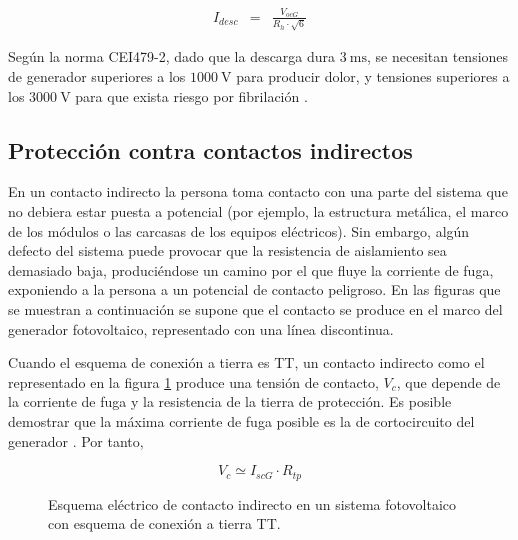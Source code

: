 \begin{eqnarray}
I_{desc} & = & \frac{V_{ocG}}{R_{h}\cdot\sqrt{6}}\label{eq:IdescIT}\end{eqnarray}

Según la norma CEI479-2, dado que la descarga dura $\SI{3}{\milli\second}$,
se necesitan tensiones de generador superiores a los $\SI{1000}{\volt}$
para producir dolor, y tensiones superiores a los $\SI{3000}{\volt}$
para que exista riesgo por fibrilación \cite{PerezGabarda2000a}.


\subsection{Protección contra contactos indirectos}

En un contacto indirecto la persona toma contacto con una parte del
sistema que no debiera estar puesta a potencial (por ejemplo, la estructura
metálica, el marco de los módulos o las carcasas de los equipos eléctricos).
Sin embargo, algún defecto del sistema puede provocar que la resistencia
de aislamiento sea demasiado baja, produciéndose un camino por el
que fluye la corriente de fuga, exponiendo a la persona a un potencial
de contacto peligroso. En las figuras que se muestran a continuación
se supone que el contacto se produce en el marco del generador fotovoltaico,
representado con una línea discontinua.

Cuando el esquema de conexión a tierra es TT, un contacto indirecto
como el representado en la figura \ref{fig:ContactoIndirectoTT} produce
una tensión de contacto, $V_{c}$,
que depende de la corriente de fuga y la resistencia de la tierra
de protección. Es posible demostrar que la máxima corriente de fuga
posible es la de cortocircuito del generador \cite{Gomez-Vidal2000}.
Por tanto, 

\begin{equation}
V_{c}\simeq I_{scG}\cdot R_{tp}\label{eq:VcIndirectoTT}\end{equation}


%
\begin{figure}
\hfill{}\hfill{}\hfill{}

\caption{Esquema eléctrico de contacto indirecto en un sistema fotovoltaico
con esquema de conexión a tierra TT.\label{fig:ContactoIndirectoTT}}

\end{figure}



